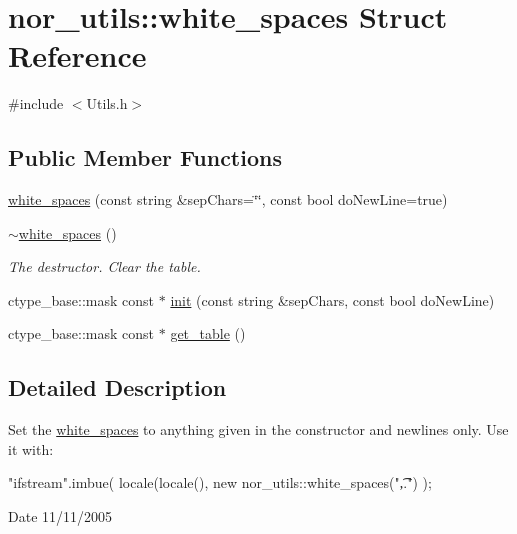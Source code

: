 \hypertarget{structnor__utils_1_1white__spaces}{
\section{nor\_\-utils::white\_\-spaces Struct Reference}
\label{structnor__utils_1_1white__spaces}
}


{\ttfamily \#include $<$Utils.h$>$}

\subsection*{Public Member Functions}
\begin{DoxyCompactItemize}
\item 
\hyperlink{structnor__utils_1_1white__spaces_a846e83a0ee3429cba8f6d5eb4a79aad9}{white\_\-spaces} (const string \&sepChars=\char`\"{}\char`\"{}, const bool doNewLine=true)
\item 
\hypertarget{structnor__utils_1_1white__spaces_ad590d0f1723a9de255ae6755a86095a9}{
\hyperlink{structnor__utils_1_1white__spaces_ad590d0f1723a9de255ae6755a86095a9}{$\sim$white\_\-spaces} ()}
\label{structnor__utils_1_1white__spaces_ad590d0f1723a9de255ae6755a86095a9}

\begin{DoxyCompactList}\small\item\em The destructor. Clear the table. \end{DoxyCompactList}\item 
ctype\_\-base::mask const $\ast$ \hyperlink{structnor__utils_1_1white__spaces_a76cc44ec62f98207f96416d0049a8032}{init} (const string \&sepChars, const bool doNewLine)
\item 
ctype\_\-base::mask const $\ast$ \hyperlink{structnor__utils_1_1white__spaces_a1f994bd6a6f35620ac93d56009e61ff7}{get\_\-table} ()
\end{DoxyCompactItemize}


\subsection{Detailed Description}
Set the \hyperlink{structnor__utils_1_1white__spaces}{white\_\-spaces} to anything given in the constructor and newlines only. Use it with: 
\begin{DoxyCode}
 "ifstream".imbue( locale(locale(), new nor_utils::white_spaces("\t ,.") ); 
\end{DoxyCode}
 \begin{DoxyDate}{Date}
11/11/2005 
\end{DoxyDate}


